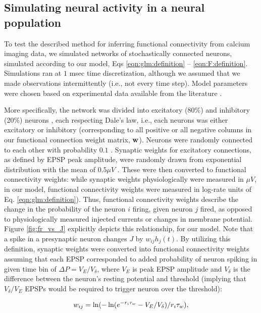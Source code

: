 \subsection{Simulating neural activity in a neural population} \label{sec:results:simulations}

To test the described method for inferring functional connectivity from calcium imaging data, we simulated networks of stochastically connected neurons, simulated according to our model, Eqs \ref{eqn:glm:definition} -- \ref{eqn:F:definition}.  Simulations ran at $1$ msec time discretization, although we assumed that we made observations intermittently (i.e., not every time step). Model parameters were chosen based on experimental data available from the literature \cite{Braitenberg1998, Urquijo2000, Lefort2009, Sayer1990}.  

More specifically, the network was divided into excitatory (80\%) and inhibitory (20\%) neurons \cite{Braitenberg1998, Urquijo2000}, each respecting Dale's law, i.e., each neurons was either excitatory or inhibitory (corresponding to all positive or all negative columns in our functional connection weight matrix, $\mathbf{w}$). Neurons were randomly connected to each other with probability $0.1$ \cite{Braitenberg1998, Lefort2009}. Synaptic weights for excitatory connections, as defined by EPSP peak amplitude, were randomly drawn from exponential distribution with the mean of $0.5 \mu V$ \cite{Lefort2009, Sayer1990}. These were then converted to functional connectivity weights: while synaptic weights physiologically were measured in $\mu V$, in our model, functional connectivity weights were measured in log-rate units of Eq. \ref{eqn:glm:definition}). Thus, functional connectivity weights describe the change in the probability of the neuron $i$ firing, given neuron $j$ fired, as opposed to physiologically measured injected currents or changes in membrane potential. Figure \ref{fig:fr_vs_J} explicitly depicts this relationship, for our model.  Note that a spike in a presynaptic neuron changes $J$ by $w_{ij}h_j(t)$. By utilizing this definition, synaptic weights were converted into functional connectivity weights assuming that each EPSP corresponded to added probability of neuron spiking in given time bin of $\Delta P = V_E/V_{\delta}$, where $V_E$ is peak EPSP amplitude and $V_{\delta}$ is the difference between the neuron's resting potential and threshold (implying that $V_{\delta}/V_E$ EPSPs would be required to trigger neuron over the threshold):

\begin{equation}\label{eqn:convert}
\w_{ij}=\ln(-\ln(e^{-r_i\tau_w}-V_E/V_{\delta})/r_i\tau_w),
\end{equation}

